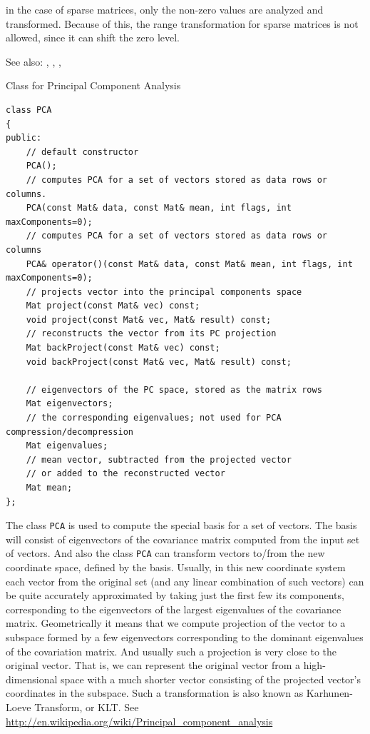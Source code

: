 in the case of sparse matrices, only the non-zero values are analyzed and transformed. Because of this, the range transformation for sparse matrices is not allowed, since it can shift the zero level. 

See also: , , , 


\label{PCA}
Class for Principal Component Analysis

\begin{lstlisting}
class PCA
{
public:
    // default constructor
    PCA();
    // computes PCA for a set of vectors stored as data rows or columns.
    PCA(const Mat& data, const Mat& mean, int flags, int maxComponents=0);
    // computes PCA for a set of vectors stored as data rows or columns
    PCA& operator()(const Mat& data, const Mat& mean, int flags, int maxComponents=0);
    // projects vector into the principal components space
    Mat project(const Mat& vec) const;
    void project(const Mat& vec, Mat& result) const;
    // reconstructs the vector from its PC projection
    Mat backProject(const Mat& vec) const;
    void backProject(const Mat& vec, Mat& result) const;

    // eigenvectors of the PC space, stored as the matrix rows
    Mat eigenvectors;
    // the corresponding eigenvalues; not used for PCA compression/decompression
    Mat eigenvalues;
    // mean vector, subtracted from the projected vector
    // or added to the reconstructed vector
    Mat mean;
};
\end{lstlisting}

The class \texttt{PCA} is used to compute the special basis for a set of vectors. The basis will consist of eigenvectors of the covariance matrix computed from the input set of vectors. And also the class \texttt{PCA} can transform vectors to/from the new coordinate space, defined by the basis. Usually, in this new coordinate system each vector from the original set (and any linear combination of such vectors) can be quite accurately approximated by taking just the first few its components, corresponding to the eigenvectors of the largest eigenvalues of the covariance matrix. Geometrically it means that we compute projection of the vector to a subspace formed by a few eigenvectors corresponding to the dominant eigenvalues of the covariation matrix. And usually such a projection is very close to the original vector. That is, we can represent the original vector from a high-dimensional space with a much shorter vector consisting of the projected vector's coordinates in the subspace. Such a transformation is also known as Karhunen-Loeve Transform, or KLT. See \url{http://en.wikipedia.org/wiki/Principal\_component\_analysis}


